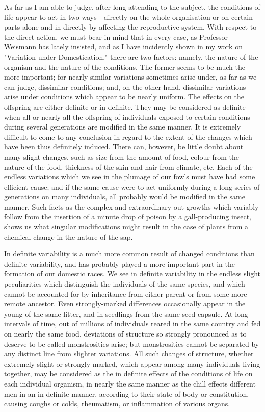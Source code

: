 As far as I am able to judge, after long attending to the
subject, the conditions of life appear to act in two ways—directly
on the whole organisation or on certain parts alone and in directly
by affecting the reproductive system. With respect to the direct
action, we must bear in mind that in every case, as Professor
Weismann has lately insisted, and as I have incidently shown in my
work on "Variation under Domestication," there are two factors:
namely, the nature of the organism and the nature of the
conditions. The former seems to be much the more important; for
nearly similar variations sometimes arise under, as far as we can
judge, dissimilar conditions; and, on the other hand, dissimilar
variations arise under conditions which appear to be nearly
uniform. The effects on the offspring are either definite or in
definite. They may be considered as definite when all or nearly all
the offspring of individuals exposed to certain conditions during
several generations are modified in the same manner. It is
extremely difficult to come to any conclusion in regard to the
extent of the changes which have been thus definitely induced.
There can, however, be little doubt about many slight changes, such
as size from the amount of food, colour from the nature of the
food, thickness of the skin and hair from climate, etc. Each of the
endless variations which we see in the plumage of our fowls must
have had some efficient cause; and if the same cause were to act
uniformly during a long series of generations on many individuals,
all probably would be modified in the same manner. Such facts as
the complex and extraordinary out growths which variably follow
from the insertion of a minute drop of poison by a gall-producing
insect, shows us what singular modifications might result in the
case of plants from a chemical change in the nature of the sap.

In definite variability is a much more common result of changed
conditions than definite variability, and has probably played a
more important part in the formation of our domestic races. We see
in definite variability in the endless slight peculiarities which
distinguish the individuals of the same species, and which cannot
be accounted for by inheritance from either parent or from some
more remote ancestor. Even strongly-marked differences occasionally
appear in the young of the same litter, and in seedlings from the
same seed-capsule. At long intervals of time, out of millions of
individuals reared in the same country and fed on nearly the same
food, deviations of structure so strongly pronounced as to deserve
to be called monstrosities arise; but monstrosities cannot be
separated by any distinct line from slighter variations. All such
changes of structure, whether extremely slight or strongly marked,
which appear among many individuals living together, may be
considered as the in definite effects of the conditions of life on
each individual organism, in nearly the same manner as the chill
effects different men in an in definite manner, according to their
state of body or constitution, causing coughs or colds, rheumatism,
or inflammation of various organs.

